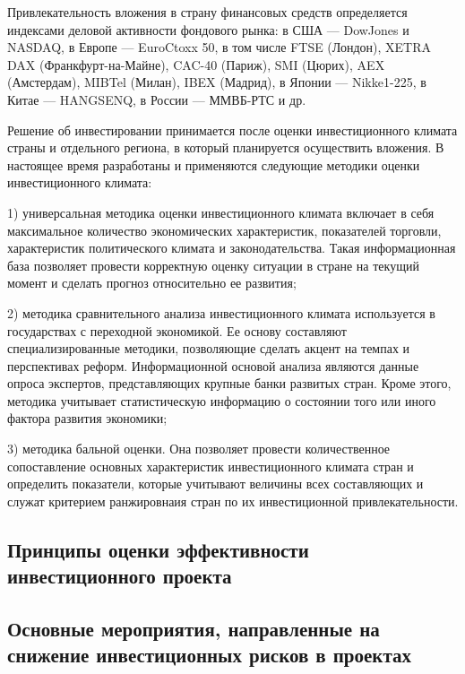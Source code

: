 Привлекательность вложения в страну финансовых средств определяется индексами деловой активности фондового рынка: в США --- DowJones и NASDAQ, в Европе --- EuroCtoxx 50,  в том числе FTSE (Лондон), XETRA DAX (Франкфурт-на-Майне), CAC-40 (Париж), SMI (Цюрих), AEX (Амстердам), MIBTel (Милан), IBEX (Мадрид), в Японии --- Nikke1-225, в Китае --- HANGSENQ, в России --- ММВБ-РТС и др.

Решение об инвестировании принимается после оценки инвестиционного климата страны и отдельного региона, в который планируется осуществить вложения.
В настоящее время разработаны и применяются следующие методики оценки инвестиционного климата:

1) универсальная методика оценки инвестиционного климата включает в себя максимальное количество экономических характеристик, показателей торговли, характеристик политического климата и законодательства.
Такая информационная база позволяет провести корректную оценку ситуации в стране на текущий момент и сделать прогноз относительно ее развития;

2) методика сравнительного анализа инвестиционного климата используется в государствах с переходной экономикой.
Ее основу составляют специализированные методики, позволяющие сделать акцент на темпах и перспективах реформ.
Информационной основой анализа являются данные опроса экспертов, представляющих крупные банки развитых стран.
Кроме этого, методика учитывает статистическую информацию о состоянии того или иного фактора развития экономики;

3) методика бальной оценки.
Она позволяет провести количественное сопоставление основных характеристик инвестиционного климата стран и определить показатели, которые учитывают величины всех составляющих и служат критерием ранжировнаия стран по их инвестиционной привлекательности.

















\subsection{Принципы оценки эффективности инвестиционного проекта}
\subsection{Основные мероприятия, направленные на снижение инвестиционных рисков в проектах}
